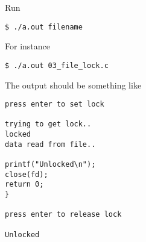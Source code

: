 Run
\begin{lstlisting}[style=shell-command]
$ ./a.out filename
\end{lstlisting}
For instance
\begin{lstlisting}[style=shell-command]
$ ./a.out 03_file_lock.c
\end{lstlisting}
The output should be something like
\begin{lstlisting}[style=shell-output]
press enter to set lock

trying to get lock..
locked
data read from file..

printf("Unlocked\n");
close(fd);
return 0;
}

press enter to release lock

Unlocked
\end{lstlisting}


